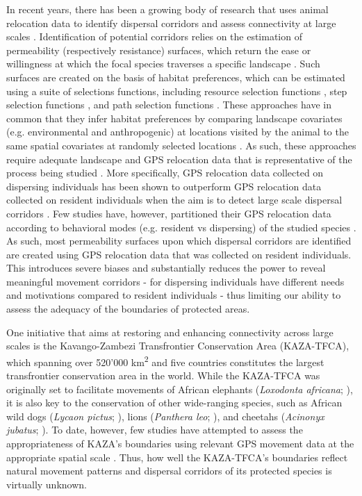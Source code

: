 \documentclass[abstract=on,10pt,a4paper,bibliography=totocnumbered]{article}
\begin{document}
In recent years, there has been a growing body of research that uses animal
relocation data to identify dispersal corridors and assess connectivity at large
scales \citep{Chetkiewicz.2006, Doerr.2011, Squires.2013, Elliot.2014,
Benz.2016, Osipova.2019}. Identification of potential corridors relies on the
estimation of permeability (respectively resistance) surfaces, which return the
ease or willingness at which the focal species traverses a specific landscape
\citep{Sawyer.2011}. Such surfaces are created on the basis of habitat
preferences, which can be estimated using a suite of selections functions,
including resource selection functions \citep{Boyce.2002}, step selection
functions \citep{Fortin.2005}, and path selection functions
\citep{Cushman.2010}. These approaches have in common that they infer habitat
preferences by comparing landscape covariates (e.g. environmental and
anthropogenic) at locations visited by the animal to the same spatial covariates
at randomly selected locations \citep{Zeller.2012}. As such, these approaches
require adequate landscape and GPS relocation data that is representative of the
process being studied \citep{Diniz.2020}. More specifically, GPS relocation
data collected on dispersing individuals has been shown to outperform GPS
relocation data collected on resident individuals when the aim is to detect
large scale dispersal corridors \citep{Elliot.2014, Diniz.2020}. Few studies
have, however, partitioned their GPS relocation data according to behavioral
modes (e.g. resident vs dispersing) of the studied species \citep{Wilson.2012,
Vasudev.2015}. As such, most permeability surfaces upon which dispersal
corridors are identified are created using GPS relocation data that was
collected on resident individuals. This introduces severe biases and
substantially reduces the power to reveal meaningful movement corridors - for
dispersing individuals have different needs and motivations compared to resident
individuals \citep{Killeen.2014, Elliot.2014, Cozzi.2020} - thus limiting our
ability to assess the adequacy of the boundaries of protected areas.

One initiative that aims at restoring and enhancing connectivity across large
scales is the Kavango-Zambezi Transfrontier Conservation Area (KAZA-TFCA), which
spanning over 520'000 km\textsuperscript{2} and five countries constitutes the
largest transfrontier conservation area in the world. While the KAZA-TFCA was
originally set to facilitate movements of African elephants (\textit{Loxodonta
africana}; \citealp{Tshipa.2017}), it is also key to the conservation of  other
wide-ranging species, such as African wild dogs (\textit{Lycaon pictus};
\citealp{Woodroffe.2012, Cozzi.2020}), lions (\textit{Panthera leo};
\citealp{Elliot.2014, Cushman.2018}), and cheetahs (\textit{Acinonyx jubatus};
\citealp{Weise.2017}). To date, however, few studies have attempted to assess
the appropriateness of KAZA's boundaries using relevant GPS movement  data at
the appropriate spatial scale \citep{Elliot.2014, Tshipa.2017}. Thus, how well
the KAZA-TFCA's boundaries reflect natural movement patterns and dispersal
corridors of its protected species is virtually unknown.
\end{document}
